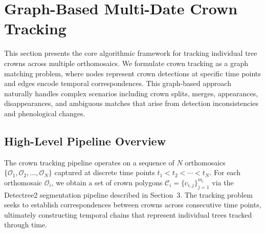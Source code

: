 \section{Graph-Based Multi-Date Crown Tracking}

This section presents the core algorithmic framework for tracking individual tree crowns across multiple orthomosaics. We formulate crown tracking as a graph matching problem, where nodes represent crown detections at specific time points and edges encode temporal correspondences. This graph-based approach naturally handles complex scenarios including crown splits, merges, appearances, disappearances, and ambiguous matches that arise from detection inconsistencies and phenological changes.

\subsection{High-Level Pipeline Overview}

The crown tracking pipeline operates on a sequence of $N$ orthomosaics $\{\mathcal{O}_1, \mathcal{O}_2, \ldots, \mathcal{O}_N\}$ captured at discrete time points $t_1 < t_2 < \cdots < t_N$. For each orthomosaic $\mathcal{O}_i$, we obtain a set of crown polygons $\mathcal{C}_i = \{c_{i,j}\}_{j=1}^{m_i}$ via the Detectree2 segmentation pipeline described in Section~3. The tracking problem seeks to establish correspondences between crowns across consecutive time points, ultimately constructing temporal chains that represent individual trees tracked through time.

